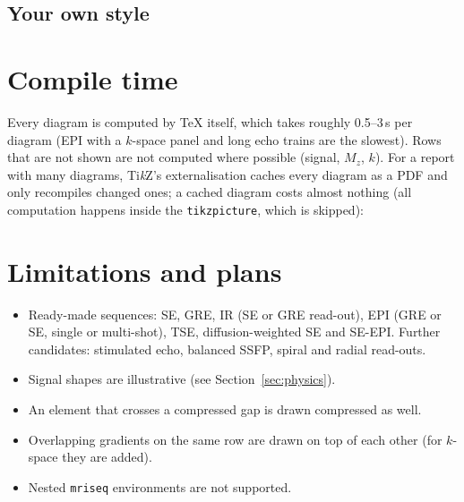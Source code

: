 \documentclass[11pt]{article}
\begin{document}
\subsection{Your own style}
\begin{example}
\GradientEchoDiagram[style=report, rows={rf,gz,gy,gx}, values]
\end{example}

\section{Compile time}
Every diagram is computed by \TeX{} itself, which takes roughly 0.5--3\,s per
diagram (EPI with a $k$-space panel and long echo trains are the slowest).
Rows that are not shown are not computed where possible (signal, $M_z$, $k$).
For a report with many diagrams, Ti\emph{k}Z's externalisation caches every
diagram as a PDF and only recompiles changed ones; a cached diagram costs
almost nothing (all computation happens inside the \texttt{tikzpicture}, which
is skipped):
\begin{exampleonly}
\usetikzlibrary{external}
\tikzexternalize[prefix=tikzcache/]   %
\end{exampleonly}

\section{Limitations and plans}
\begin{itemize}
\item Ready-made sequences: SE, GRE, IR (SE or GRE read-out), EPI (GRE or SE,
      single or multi-shot), TSE, diffusion-weighted SE and SE-EPI. Further
      candidates: stimulated echo, balanced SSFP, spiral and radial read-outs.
\item Signal shapes are illustrative (see Section~\ref{sec:physics}).
\item An element that crosses a compressed gap is drawn compressed as well.
\item Overlapping gradients on the same row are drawn on top of each other (for
      $k$-space they are added).
\item Nested \texttt{mriseq} environments are not supported.
\end{itemize}
\end{document}
